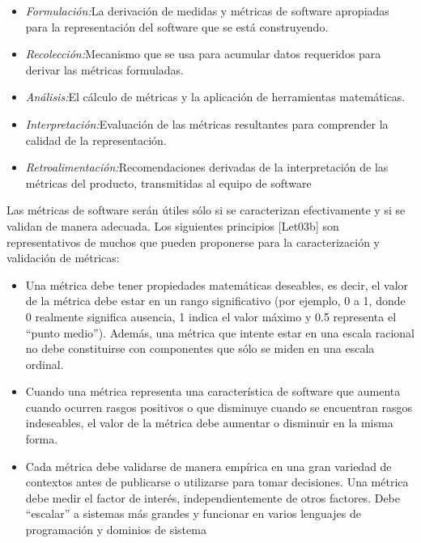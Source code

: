 \begin{itemize}
    \item \textit{Formulación:}La derivación de medidas y métricas de software apropiadas para la representación del software que se está construyendo.
    \item \textit{Recolección:}Mecanismo que se usa para acumular datos requeridos para derivar las métricas formuladas.
    \item \textit{Análisis:}El cálculo de métricas y la aplicación de herramientas matemáticas.
    \item \textit{Interpretación:}Evaluación de las métricas resultantes para comprender la calidad de la representación.
    \item \textit{Retroalimentación:}Recomendaciones derivadas de la interpretación de las métricas del producto, transmitidas al equipo de software
\end{itemize}

Las métricas de software serán útiles sólo si se caracterizan efectivamente y si se validan de manera adecuada. Los siguientes principios [Let03b] son representativos de muchos que pueden proponerse para la caracterización y validación de métricas:\\

\begin{itemize}
    \item Una métrica debe tener propiedades matemáticas deseables, es decir, el valor de la métrica debe estar en un rango significativo (por ejemplo, 0 a 1, donde 0 realmente significa ausencia, 1 indica el valor máximo y 0.5 representa el “punto medio”). Además, una métrica que intente estar en una escala racional no debe constituirse con componentes que sólo se miden en una escala ordinal.
    \item Cuando una métrica representa una característica de software que aumenta cuando ocurren rasgos positivos o que disminuye cuando se encuentran rasgos indeseables, el valor de la métrica debe aumentar o disminuir en la misma forma.
    \item Cada métrica debe validarse de manera empírica en una gran variedad de contextos antes de publicarse o utilizarse para tomar decisiones. Una métrica debe medir el factor de interés, independientemente de otros factores. Debe “escalar” a sistemas más grandes y funcionar en varios lenguajes de programación y dominios de sistema
\end{itemize}


